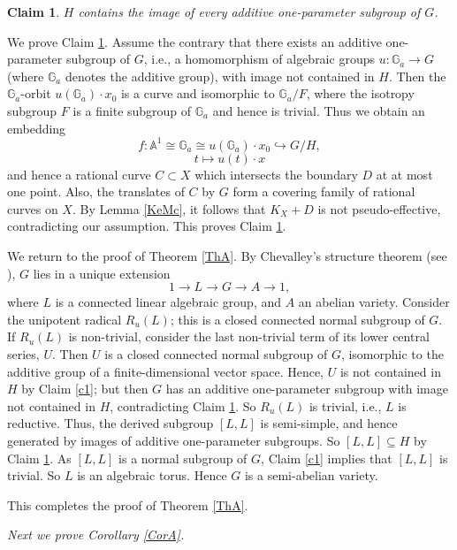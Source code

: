\documentclass[12pt,a4paper]{amsart}
\theoremstyle{plain}
\newtheorem{claim}[thm]{Claim}
\theoremstyle{definition}
\theoremstyle{remark}
\begin{document}
\begin{claim}\label{c2}
$H$ contains the image of every additive one-parameter subgroup
of $G$.
\end{claim}

We prove Claim \ref{c2}.
Assume the contrary that there exists an additive one-parameter subgroup of $G$,
i.e., a homomorphism of algebraic groups $u : {\mathbb{G}}_a \to G$
(where ${\mathbb{G}}_a$ denotes the additive group), with image not contained
in $H$. Then the ${\mathbb{G}}_a$-orbit $u({\mathbb{G}}_a) \cdot x_0$ is a curve and isomorphic
to ${\mathbb{G}}_a/F$, where the isotropy subgroup $F$ is a finite subgroup of
${\mathbb{G}}_a$ and hence is trivial. Thus we obtain an embedding
\[
f : {\mathbb{A}}^1 \cong {\mathbb{G}}_a \cong u({\mathbb{G}}_a) \cdot x_0 \hookrightarrow G/H, \]
\[ t \longmapsto u(t) \cdot x \]
and hence a rational curve $C \subset X$
which intersects the boundary $D$ at at most one point. Also, the translates of
$C$ by $G$ form a covering family of rational curves on $X$. By Lemma
\ref{KeMc}, it follows that $K_X + D$ is not pseudo-effective,
contradicting our assumption. This proves Claim \ref{c2}.

\par \vskip 1pc
We return to the proof of Theorem \ref{ThA}.
By Chevalley's structure theorem
(see \cite[Thm.~16]{Ro56}), $G$ lies in a unique extension
\[ 1 \longrightarrow L \longrightarrow G \longrightarrow A \longrightarrow 1, \]
where $L$ is a connected linear algebraic group, and  $A$ an abelian variety.
Consider the unipotent radical
$R_u(L)$; this is a closed connected normal subgroup of $G$.
If $R_u(L)$ is non-trivial, consider the last non-trivial
term of its lower central series, $U$. Then $U$ is a closed
connected normal subgroup of $G$, isomorphic to the additive
group of a finite-dimensional vector space. Hence, $U$ is not
contained in $H$ by Claim \ref{c1}; but then $G$ has an additive one-parameter
subgroup with image not contained in $H$, contradicting Claim \ref{c2}.
So $R_u(L)$ is trivial, i.e., $L$ is reductive.
Thus, the derived subgroup $[L,L]$ is semi-simple,
and hence generated by images of additive
one-parameter subgroups. So $[L,L] \subseteq H$ by Claim \ref{c2}.
As $[L,L]$ is a normal subgroup of $G$, Claim \ref{c1} implies that $[L,L]$
is trivial. So $L$ is an algebraic torus. Hence $G$ is a semi-abelian
variety.

\par \vskip 1pc
This completes the proof of Theorem \ref{ThA}.

\par \vskip 1pc
{\it Next we prove Corollary \ref{CorA}.}
\end{document}
